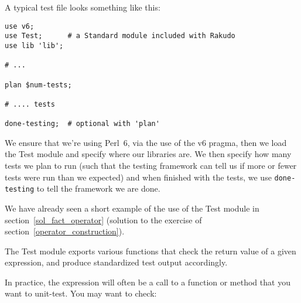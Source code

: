 A typical test file looks something like this:

\begin{verbatim}
use v6;
use Test;      # a Standard module included with Rakudo
use lib 'lib';

# ...

plan $num-tests;

# .... tests

done-testing;  # optional with 'plan'
\end{verbatim}

We ensure that we're using Perl~6, via the use of the v6 pragma, 
then we load the Test module and specify where our 
libraries are. We then specify how many tests we plan 
to run (such that the testing framework can tell us 
if more or fewer tests were run than we expected) 
and when finished with the tests, we use {\tt done-testing} 
to tell the framework we are done.

We have already seen a short example of the use of the Test 
module in section~\ref{sol_fact_operator} (solution 
to the exercise of section~\ref{operator_construction}).

The Test module exports various functions that check the return 
value of a given expression, and produce standardized test 
output accordingly.

In practice, the expression will often be a call to a function 
or method that you want to unit-test. You may want to check:

